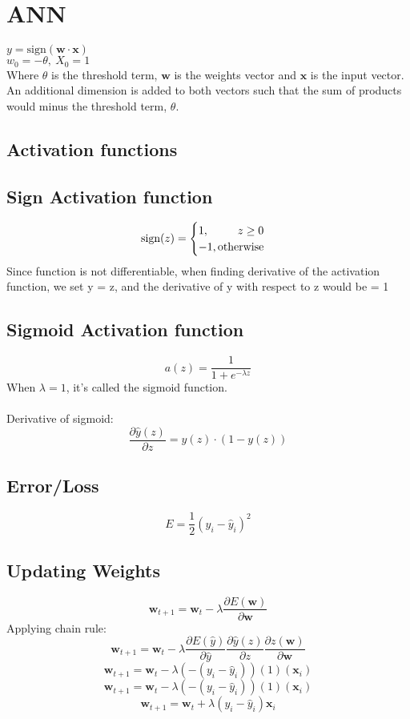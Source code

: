 \section{ANN}
$y = \text{sign}(\mathbf{w} \cdot \mathbf{x})$\\
$w_0 = -\theta,\ X_0 = 1$\\
Where $\theta$ is the threshold term, $\mathbf{w}$ is the weights vector and 
$\mathbf{x}$ is the input vector. An additional dimension is added to both vectors 
such that the sum of products would minus the threshold term, $\theta$.
\subsection*{Activation functions}
\subsection*{Sign Activation function}
\[\text{sign}(z) = \begin{cases}
    1,\hfill z\geq 0\\
    -1,\hfill \text{otherwise}
\end{cases}\]
Since function is not differentiable, 
when finding derivative of the activation function, we set 
y = z, and the derivative of y with respect to z would be = 1

\subsection*{Sigmoid Activation function}
\[a(z) = \frac{1}{1+e^{-\lambda z}}\]
When $\lambda = 1$, it's called the sigmoid function.\\\\
Derivative of sigmoid: 
\[\frac{\partial \hat{y}(z)}{\partial z} = y(z)\cdot (1 - y(z))\]


\subsection*{Error/Loss}
\[E = \frac{1}{2}(y_i - \hat{y}_i)^2\]
\subsection*{Updating Weights}
\[\mathbf{w}_{t+1} = \mathbf{w}_{t} - \lambda \frac{\partial E(\mathbf{w})}{\partial \mathbf{w}}\]
Applying chain rule:
\[\mathbf{w}_{t+1} = \mathbf{w}_{t} - \lambda \frac{\partial E(\hat{y})}{\partial \hat{y}}\frac{\partial \hat{y}(z)}{\partial z}\frac{\partial z(\mathbf{w})}{\partial \mathbf{w}}\]
\[\mathbf{w}_{t+1} = \mathbf{w}_{t} - \lambda (-(y_i - \hat{y}_i))(1)(\mathbf{x}_i)\]
\[\mathbf{w}_{t+1} = \mathbf{w}_{t} - \lambda (-(y_i - \hat{y}_i))(1)(\mathbf{x}_i)\]
\[\mathbf{w}_{t+1} = \mathbf{w}_{t} + \lambda (y_i - \hat{y}_i)\mathbf{x}_i\]
